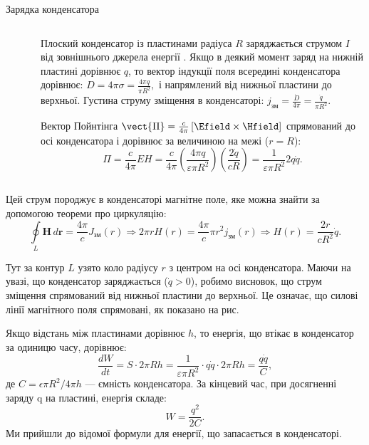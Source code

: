\documentclass[onlytextwidth]{beamer}
\begin{document}
\begin{frame}{Зарядка конденсатора}{}
\begin{columns}
\begin{column}{0.35\linewidth}
		\end{column}
        \
		\begin{column}{0.6\linewidth}
			\begin{overprint}
				\begin{block}{}\justifying
					Плоский конденсатор із пластинами радіуса \( R \) заряджається струмом \( I \) від зовнішнього джерела енергії . Якщо в
					деякий момент
					заряд на нижній пластині дорівнює \( q \), то вектор індукції поля всередині конденсатора дорівнює:
					\(
					D = 4 \pi \sigma = \frac{4 \pi q}{\pi R^2},
					\)
					і напрямлений від нижньої пластини до верхньої.
					Густина струму зміщення в конденсаторі:
					\(
					j_{\text{зм}} = \frac{\dot{D}}{4 \pi} = \frac{\dot{q}}{\pi R^2}.
					\)
				\end{block}
				\onslide<2>
				\begin{block}{}\justifying
					Вектор Пойнтінга
					\(
					\vect{\Pi} = \frac{c}{4\pi}\left[\Efield\times\Hfield\right]
					\)
					спрямований до осі конденсатора і дорівнює за величиною на межі (\( r = R \)):
					\[
						\Pi = \frac{c}{4 \pi} EH = \frac{c}{4 \pi} \left( \frac{4 \pi q}{\varepsilon \pi R^2} \right) \left( \frac{2
							\dot{q}}{c R}
						\right) =
						\frac{1}{\varepsilon
							\pi R^2} 2 q \dot{q}.
					\]
				\end{block}
			\end{overprint}
		\end{column}
	\end{columns}
	\begin{overprint}
		\begin{block}{}\justifying
			Цей струм породжує в конденсаторі магнітне поле, яке можна знайти за допомогою теореми про циркуляцію:
			\[
				\oint\limits_{L} \mathbf{H} \, d\mathbf{r} = \frac{4 \pi}{c} J_{\text{зм}}(r)
				\Rightarrow 2 \pi r H(r) = \frac{4 \pi}{c} \pi r^2 j_{\text{зм}}(r)
				\Rightarrow H(r) = \frac{2r}{c R^2} \dot{q}.
			\]

			Тут за контур \( L \) узято коло радіусу \( r \) з центром на осі конденсатора. Маючи на увазі, що конденсатор заряджається (\(
			\dot{q} > 0 \)), робимо висновок, що струм зміщення спрямований від нижньої пластини до верхньої. Це означає, що силові лінії
			магнітного поля
			спрямовані, як 	показано на рис.
		\end{block}
		\begin{block}{}\justifying
			Якщо відстань між пластинами дорівнює \( h \), то енергія, що втікає в конденсатор за одиницю часу, дорівнює:
			\[
				\frac{dW}{dt} = S \cdot 2 \pi R h = \frac{1}{\varepsilon \pi R^2} \cdot q \dot{q} \cdot 2 \pi R h = \frac{q \dot{q}}{C},
			\]
			де \( C = \epsilon \pi R^2 / 4\pi h\) --- ємність конденсатора. За кінцевий час, при досягненні заряду q на пластині, енергія складе:
			\[
				W = \frac{q^2}{2C}.
			\]
			Ми прийшли до відомої формули для енергії, що запасається в конденсаторі.
		\end{block}
	\end{overprint}
\end{frame}
\end{document}
